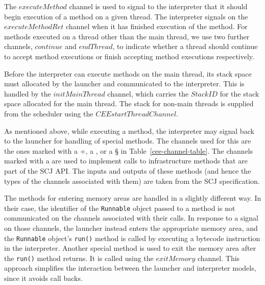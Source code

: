 The $executeMethod$ channel is used to signal to the interpreter that
it should begin execution of a method on a given thread.
The interpreter signals on the $executeMethodRet$ channel when it has
finished execution of the method.
For methods executed on a thread other than the main thread, we use
two further channels, $continue$ and $endThread$, to indicate whether
a thread should continue to accept method executions or finish
accepting method executions respectively.

Before the interpreter can execute methods on the main thread, its
stack space must allocated by the launcher and
communicated to the interpreter.
This is handled by the $initMainThread$ channel, which carries the
$StackID$ for the stack space allocated for the main thread.
The stack for non-main threads is supplied from the scheduler using
the $CEEstartThreadChannel$.

As mentioned above, while executing a method, the interpreter may
signal back to the launcher for handling of special methods.
The channels used for this are the ones marked with a {}+{}, a \dag{},
or a \S{} in Table~\ref{cee-channel-table}.
The channels marked with a \dag{} are used to implement calls to
infrastructure methods that are part of the SCJ API.
The inputs and outputs of these methods (and hence the types of the
channels associated with them) are taken from the SCJ specification.

The methods for entering memory areas are handled in a slightly
different way. 
In their case, the identifier of the \texttt{Runnable} object passed
to a method is not communicated on the channels associated with their
calls.
In response to a signal on those channels, the launcher instead enters
the appropriate memory area, and the \texttt{Runnable} object's
\texttt{run()} method is called by executing a bytecode instruction in
the interpreter.
Another special method is used to exit the memory area after the
\texttt{run()} method returns.
It is called using the $exitMemory$ channel.
This approach simplifies the interaction between the launcher and
interpreter models, since it avoids call backs.

